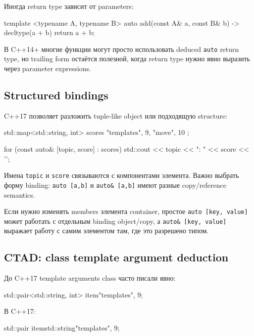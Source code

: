 Иногда return type зависит от parameters:

\begin{cppcode}
template <typename A, typename B>
auto add(const A& a, const B& b) -> decltype(a + b) {
    return a + b;
}
\end{cppcode}

В C++14+ многие функции могут просто использовать deduced \texttt{auto} return
type, но trailing form остаётся полезной, когда return type нужно явно выразить
через parameter expressions.

\subsection{Structured bindings}

C++17 позволяет разложить tuple-like object или подходящую structure:

\begin{cppcode}
std::map<std::string, int> scores{
    {"templates", 9},
    {"move", 10}
};

for (const auto& [topic, score] : scores) {
    std::cout << topic << ": " << score << '\n';
}
\end{cppcode}

Имена \texttt{topic} и \texttt{score} связываются с компонентами элемента.
Важно выбрать форму binding:
\texttt{auto [a,b]} и \texttt{auto\& [a,b]} имеют разные copy/reference
semantics.

\begin{warningbox}
Если нужно изменять members элемента container, простое
\texttt{auto [key, value]} может работать с отдельным binding object/copy,
а \texttt{auto\& [key, value]} выражает работу с самим элементом там, где это
разрешено типом.
\end{warningbox}

\subsection{CTAD: class template argument deduction}

До C++17 template arguments class часто писали явно:

\begin{cppcode}
std::pair<std::string, int> item{"templates", 9};
\end{cppcode}

В C++17:

\begin{cppcode}
std::pair item{std::string{"templates"}, 9};
\end{cppcode}

